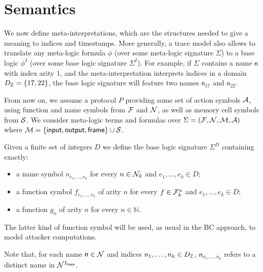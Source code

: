 \section{Semantics}

We now define meta-interpretations, which are the structures needed to
give a meaning to indices and timestamps. More generally, a trace model
also allows to translate any meta-logic formula $\phi$
(over some meta-logic signature $\Sigma$)
to a base logic $\phi^I$ (over some base logic signature $\Sigma^I$).
For example, if
$\Sigma$ contains a name $\mathsf{n}$ with index arity $1$, and
the meta-interpretation interprets indices in a domain
$D_{\mathcal{I}} = \{ 17, 22 \}$, the base logic signature will feature
two names $\mathsf{n}_{17}$ and $\mathsf{n}_{22}$.


\medskip

From now on, we assume a protocol $P$ providing some set of action
symbols $\mathcal{A}$, using function and name symbols from $\mathcal{F}$ and $\mathcal{N}$,
as well as memory cell symbols from $\mathcal{S}$.
We consider meta-logic terms and formulas over $\Sigma = (\mathcal{F},\mathcal{N},\mathcal{M},\mathcal{A})$
where $\mathcal{M} = \{ \textsf{input}, \textsf{output}, \textsf{frame} \} \cup \mathcal{S}$.

\begin{definition}
  Given a finite set of integers $D$ we define the base logic
  signature $\Sigma^D$ containing exactly:
  \begin{itemize}
    \item a name symbol $n_{e_1,\ldots,e_k}$ for every $n \in \mathcal{N}_k$
       and $e_1,\ldots,e_k \in D$;
    \item a function symbol $f_{e_1,\ldots,e_k}$ of arity $n$ for every
      $f \in \mathcal{F}_k^n$ and $e_1,\ldots,e_k \in D$;
    \item a function $g_n$ of arity $n$ for every $n\in\mathbb{N}$.
  \end{itemize}
  The latter kind of function symbol will be used, as usual in the BC 
  approach, to model attacker computations.
\end{definition}

Note that, for each name $\mathsf{n}\in \mathcal{N}$ and indices $n_1,\ldots,n_k \in
D_{\mathcal{I}}$, $\mathsf{n}_{n_1,\ldots,n_k}$ refers to a distinct name in $\mathcal{N}^{I_{\textsf{trace}}}$.

